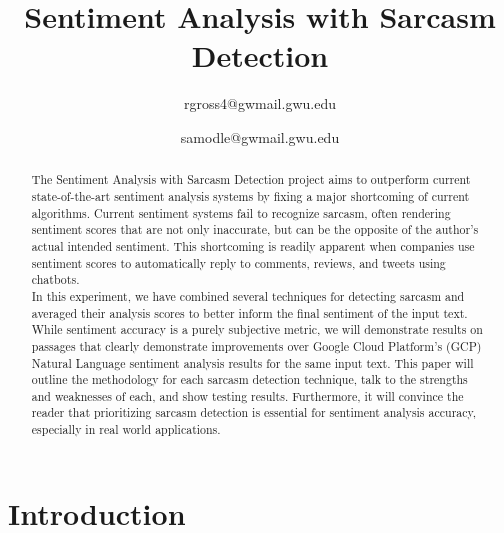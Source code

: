 \documentclass[conference]{IEEEtran}
\begin{document}
\title{Sentiment Analysis with Sarcasm Detection\\
}

\author{
rgross4@gwmail.gwu.edu
\and
{}
samodle@gwmail.gwu.edu
}

\maketitle

\begin{abstract}
The Sentiment Analysis with Sarcasm Detection project aims to outperform current state-of-the-art sentiment analysis systems by fixing a major shortcoming of current algorithms. 
Current sentiment systems fail to recognize sarcasm, often rendering sentiment scores that are not only inaccurate, but can be the opposite of the author’s actual intended sentiment. This shortcoming is readily apparent when companies use sentiment scores to automatically reply to comments, reviews, and tweets using chatbots. \\
In this experiment, we have combined several techniques for detecting sarcasm and averaged their analysis scores to better inform the final sentiment of the input text. While sentiment accuracy is a purely subjective metric, we will demonstrate results on passages that clearly demonstrate improvements over Google Cloud Platform’s (GCP) Natural Language sentiment analysis results for the same input text. 
This paper will outline the methodology for each sarcasm detection technique, talk to the strengths and weaknesses of each, and show testing results. Furthermore, it will convince the reader that prioritizing sarcasm detection is essential for sentiment analysis accuracy, especially in real world applications. 

\end{abstract}

\section{Introduction}
\end{document}
